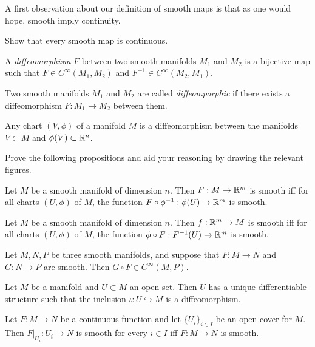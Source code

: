 A first observation about our definition of smooth maps is that as one would hope, smooth imply continuity.

\begin{exercise}
  Show that every smooth map is continuous.
\end{exercise}

\begin{definition}
A \emph{diffeomorphism} $F$ between two smooth manifolds $M_1$ and $M_2$ is a bijective map such that $F\in C^\infty(M_1, M_2)$ and $F^{-1}\in C^\infty(M_2, M_1)$.

Two smooth manifolds $M_1$ and $M_2$ are called \emph{diffeomporphic} if there exists a diffeomorphism $F:M_1\to M_2$ between them.
\end{definition}

\begin{exercise}
Any chart $(V, \phi)$ of a manifold $M$ is a diffeomorphism between the manifolds $V\subset M$ and $\phi(V)\subset\mathbb{R}^n$.
\end{exercise}

\begin{exercise}
  Prove the following propositions and aid your reasoning by drawing the relevant figures.
  \begin{proposition}
    Let $M$ be a smooth manifold of dimension $n$.
    Then $F:M\to\mathbb{R}^m$ is smooth iff for all charts $(U,\phi)$ of $M$, the function $F\circ\phi^{-1}:\phi(U)\to\mathbb{R}^m$ is smooth.
  \end{proposition}
  \begin{proposition}
    Let $M$ be a smooth manifold of dimension $n$.
    Then $f:\mathbb{R}^m\to M$ is smooth iff for all charts $(U,\phi)$ of $M$, the function $\phi\circ F:F^{-1}(U)\to\mathbb{R}^m$ is smooth.
  \end{proposition}
  \begin{proposition}
    Let $M, N, P$ be three smooth manifolds, and suppose that $F:M\to N$ and $G:N\to P$ are smooth.
    Then $G\circ F\in C^\infty(M, P)$.
  \end{proposition}
  \begin{proposition}\label{prop:uniqdiffeoinclusion}
    Let $M$ be a manifold and $U\subset M$ an open set.
    Then $U$ has a unique differentiable structure such that the inclusion $\iota:U\hookrightarrow M$ is a diffeomorphism.
  \end{proposition}
  \begin{proposition}\label{prop:smoothlocal}
    Let $F:M\to N$ be a continuous function and let $\{U_i\}_{i\in I}$ be an open cover for $M$. Then $F|_{U_i}:U_i \to N$ is smooth for every $i\in I$ iff $F:M\to N$ is smooth.
  \end{proposition}
\end{exercise}

